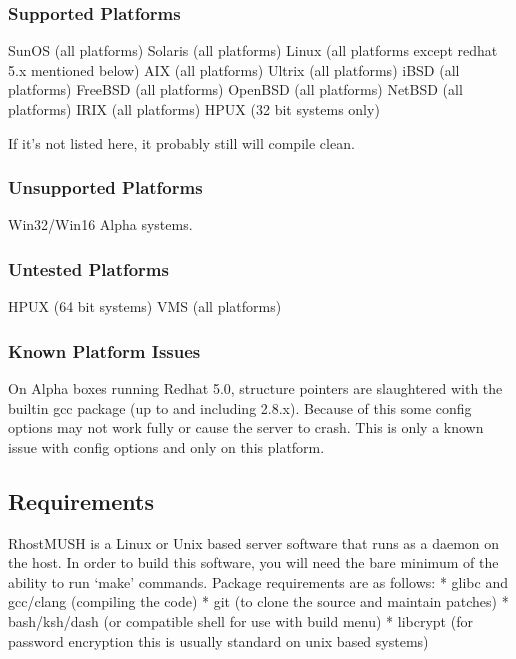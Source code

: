 \documentclass[letterpaper,10pt,english]{sphinxmanual}
\begin{document}
\subsubsection{Supported Platforms}
\label{\detokenize{requirements:supported-platforms}}
\sphinxAtStartPar
SunOS (all platforms)
Solaris (all platforms)
Linux (all platforms except redhat 5.x mentioned below)
AIX (all platforms)
Ultrix (all platforms)
iBSD (all platforms)
FreeBSD (all platforms)
OpenBSD (all platforms)
NetBSD (all platforms)
IRIX (all platforms)
HPUX (32 bit systems only)

\sphinxAtStartPar
If it’s not listed here, it probably still will compile clean.


\subsubsection{Unsupported Platforms}
\label{\detokenize{requirements:unsupported-platforms}}
\sphinxAtStartPar
Win32/Win16
Alpha systems.


\subsubsection{Untested Platforms}
\label{\detokenize{requirements:untested-platforms}}
\sphinxAtStartPar
HP\sphinxhyphen{}UX (64 bit systems)
VMS (all platforms)


\subsubsection{Known Platform Issues}
\label{\detokenize{requirements:known-platform-issues}}
\sphinxAtStartPar
On Alpha boxes running Redhat 5.0, structure pointers are slaughtered with
the built\sphinxhyphen{}in gcc package (up to and including 2.8.x).  Because of this some
config options may not work fully or cause the server to crash.  This is only
a known issue with config options and only on this platform.


\subsection{Requirements}
\label{\detokenize{requirements:id2}}
\sphinxAtStartPar
RhostMUSH is a Linux or Unix based server software that runs as a daemon on the host.  In order to build this software, you will need the bare minimum of the ability to run ‘make’ commands.  Package requirements are as follows:
* glibc and gcc/clang (compiling the code)
* git (to clone the source and maintain patches)
* bash/ksh/dash (or compatible shell \sphinxhyphen{} for use with build menu)
* libcrypt (for password encryption \sphinxhyphen{} this is usually standard on unix based systems)
\end{document}
